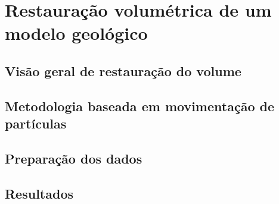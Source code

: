 
\chapter{Restauração volumétrica de um modelo geológico}

\section{Visão geral de restauração do volume}

\section{Metodologia baseada em movimentação de partículas}

\section{Preparação dos dados}

\section{Resultados}

